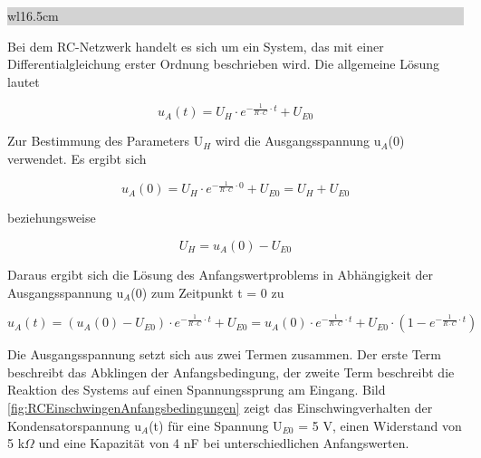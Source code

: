 \noindent
\colorbox{lightgray}{%
%
\renewcommand\arraystretch{0.6}%
\begin{tabular}{ wl{16.5cm} }
{\selectfont{
Beispiel: Einschwingverhalten eines RC-Netzwerks}}
\end{tabular}%
}\bigskip

\noindent Bei dem RC-Netzwerk handelt es sich um ein System, das mit einer Differentialgleichung erster Ordnung beschrieben wird. Die allgemeine Lösung lautet

\begin{equation}\label{eq:eightythree}
u_{A} \left(t\right)=U_{H} \cdot e^{-\frac{1}{R\cdot C} \cdot t} +U_{E0}
\end{equation}

\noindent Zur Bestimmung des Parameters U${}_{H}$ wird die Ausgangsspannung u${}_{A}$(0) verwendet. Es ergibt sich

\begin{equation}\label{eq:eightyfour}
u_{A} \left(0\right)=U_{H} \cdot e^{-\frac{1}{R\cdot C} \cdot 0} +U_{E0} =U_{H} +U_{E0}
\end{equation}

\noindent beziehungsweise

\begin{equation}\label{eq:eightyfive}
U_{H} =u_{A} \left(0\right)-U_{E0}
\end{equation}

\noindent Daraus ergibt sich die Lösung des Anfangswertproblems in Abhängigkeit der Ausgangsspannung u$_{A}$(0) zum Zeitpunkt t = 0 zu

\begin{equation}\label{eq:eightysix}
u_{A} \left(t\right)=\left(u_{A} \left(0\right)-U_{E0} \right)\cdot e^{-\frac{1}{R\cdot C} \cdot t} +U_{E0} =u_{A} \left(0\right)\cdot e^{-\frac{1}{R\cdot C} \cdot t} +U_{E0} \cdot \left(1-e^{-\frac{1}{R\cdot C} \cdot t} \right)
\end{equation}

\noindent Die Ausgangsspannung setzt sich aus zwei Termen zusammen. Der erste Term beschreibt das Abklingen der Anfangsbedingung, der zweite Term beschreibt die Reaktion des Systems auf einen Spannungssprung am Eingang. Bild \ref{fig:RCEinschwingenAnfangsbedingungen} zeigt das Einschwingverhalten der Kondensatorspannung u$_{A}$(t) für eine Spannung U$_{E0}$ = 5 V, einen Widerstand von 5 k$\Omega$ und eine Kapazität von 4 nF bei unterschiedlichen
Anfangswerten.

